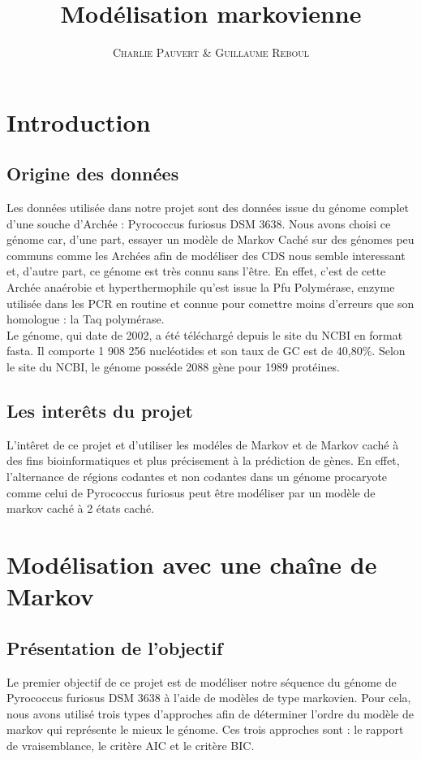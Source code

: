 \documentclass[12pt,a4paper]{article}
\title{Modélisation markovienne}
\author{\textsc{Charlie Pauvert} \& \textsc{Guillaume Reboul}}
\date{}
\begin{document}
\maketitle

\section{Introduction}
\subsection{Origine des données}
Les données utilisée dans notre projet sont des données issue du génome complet d'une souche d'Archée : Pyrococcus furiosus DSM 3638.
Nous avons choisi ce génome car, d'une part, essayer un modèle de Markov Caché sur des génomes peu communs comme les Archées afin de modéliser des CDS nous semble interessant et, d'autre part, ce génome est très connu sans l'être. En effet, c'est de cette Archée anaérobie et hyperthermophile qu'est issue la Pfu Polymérase, enzyme utilisée dans les PCR en routine et connue pour comettre moins d'erreurs que son homologue : la Taq polymérase.
\\ \indent
Le génome, qui date de 2002, a été téléchargé depuis le site du NCBI en format fasta. Il comporte 1 908 256 nucléotides et son taux de GC est de 40,80\%. Selon le site du NCBI, le génome posséde 2088 gène pour 1989 protéines.
\subsection{Les interêts du projet}
L'intêret de ce projet et d'utiliser les modéles de Markov et de Markov caché à des fins bioinformatiques et plus précisement à la prédiction de gènes. En effet, l'alternance de régions codantes et non codantes dans un génome procaryote comme celui de Pyrococcus furiosus peut être modéliser par un modèle de markov caché à 2 états caché.

\section{Modélisation avec une chaîne de Markov}
\subsection{Présentation de l'objectif}
Le premier objectif de ce projet est de modéliser notre séquence du génome de Pyrococcus furiosus DSM 3638 à l'aide de modèles de type markovien.
Pour cela, nous avons utilisé trois types d'approches afin de déterminer l'ordre du modèle de markov qui représente le mieux le génome.
Ces trois approches sont : le rapport de vraisemblance, le critère AIC et le critère BIC.
\end{document}
